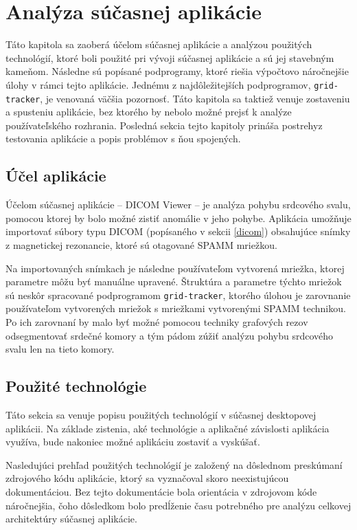 \chapter {Analýza súčasnej aplikácie}
Táto kapitola sa zaoberá účelom súčasnej aplikácie a analýzou použitých technológií, ktoré boli použité pri vývoji súčasnej aplikácie a sú jej stavebným kameňom. Následne sú popísané podprogramy, ktoré riešia výpočtovo náročnejšie úlohy v rámci tejto aplikácie. Jednému z najdôležitejších podprogramov, \texttt{grid-tracker}, je venovaná väčšia pozornosť. Táto kapitola sa taktiež venuje zostaveniu a spusteniu aplikácie, bez ktorého by nebolo možné prejsť k analýze používateľského rozhrania. Posledná sekcia tejto kapitoly prináša postrehy\newline z testovania aplikácie a popis problémov s ňou spojených.

\section {Účel aplikácie}
Účelom súčasnej aplikácie -- DICOM Viewer -- je analýza pohybu srdcového svalu, pomocou ktorej by bolo možné zistiť anomálie v jeho pohybe. Aplikácia umožňuje importovať súbory typu DICOM (popísaného v sekcii \ref{dicom}) obsahujúce snímky z magnetickej rezonancie, ktoré sú otagované SPAMM mriežkou.

Na importovaných snímkach je následne používateľom vytvorená mriežka, ktorej parametre môžu byť  manuálne upravené. Štruktúra a parametre týchto mriežok sú neskôr spracované podprogramom \texttt{grid-tracker}, ktorého úlohou je zarovnanie používateľom vytvorených mriežok s mriežkami vytvorenými SPAMM technikou. Po ich zarovnaní by malo byť možné pomocou techniky grafových rezov odsegmentovať srdečné komory a tým pádom zúžiť analýzu pohybu srdcového svalu len na tieto komory. \clearpage

\section {Použité technológie}
Táto sekcia sa venuje popisu použitých technológií v súčasnej desktopovej aplikácii. Na základe zistenia, aké technológie a aplikačné závislosti aplikácia využíva, bude nakoniec možné aplikáciu zostaviť a vyskúšať.

Nasledujúci prehľad použitých technológií je založený na dôslednom preskúmaní zdrojového kódu aplikácie, ktorý sa vyznačoval skoro neexistujúcou dokumentáciou. Bez tejto dokumentácie bola orientácia v zdrojovom kóde náročnejšia, čoho dôsledkom bolo predĺženie času potrebného pre analýzu celkovej architektúry súčasnej aplikácie.

